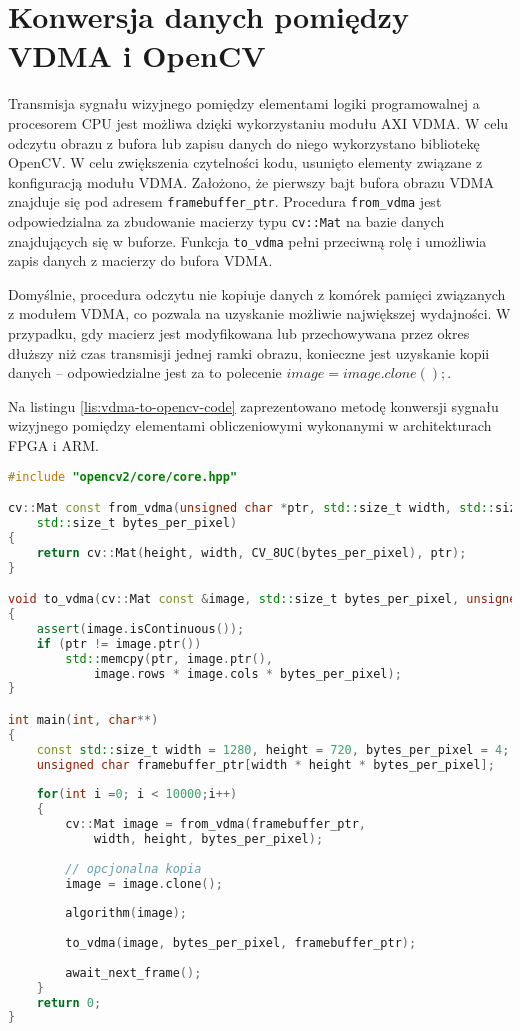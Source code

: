 \section{Konwersja danych pomiędzy VDMA i OpenCV}
\label{sec:vdma-to-opencv}

Transmisja sygnału wizyjnego pomiędzy elementami logiki programowalnej a procesorem CPU jest możliwa dzięki wykorzystaniu modułu AXI VDMA. W celu odczytu obrazu z bufora lub zapisu danych do niego wykorzystano bibliotekę OpenCV. W celu zwiększenia czytelności kodu, usunięto elementy związane z konfiguracją modułu VDMA. Założono, że pierwszy bajt bufora obrazu VDMA znajduje się pod adresem \texttt{framebuffer\_ptr}. Procedura \texttt{from\_vdma} jest odpowiedzialna za zbudowanie macierzy typu \texttt{cv::Mat} na bazie danych znajdujących się w buforze. Funkcja \texttt{to\_vdma} pełni przeciwną rolę i umożliwia zapis danych z macierzy do bufora VDMA.

Domyślnie, procedura odczytu nie kopiuje danych z komórek pamięci związanych z modułem VDMA, co pozwala na uzyskanie możliwie największej wydajności. W przypadku, gdy macierz jest modyfikowana lub przechowywana przez okres dłuższy niż czas transmisji jednej ramki obrazu, konieczne jest uzyskanie kopii danych -- odpowiedzialne jest za to polecenie $image = image.clone();$.

Na listingu \ref{lis:vdma-to-opencv-code} zaprezentowano metodę konwersji sygnału wizyjnego pomiędzy elementami obliczeniowymi wykonanymi w architekturach FPGA i ARM.


\begin{lstlisting}[language=C++, label=lis:vdma-to-opencv-code, caption=Konwersja sygnału wizyjnego pomiędzy AXI VDMA i \texttt{cv::Mat}.]
#include "opencv2/core/core.hpp"

cv::Mat const from_vdma(unsigned char *ptr, std::size_t width, std::size_t height,
	std::size_t bytes_per_pixel)
{
	return cv::Mat(height, width, CV_8UC(bytes_per_pixel), ptr);
}

void to_vdma(cv::Mat const &image, std::size_t bytes_per_pixel, unsigned char *ptr)
{
	assert(image.isContinuous());
	if (ptr != image.ptr())
		std::memcpy(ptr, image.ptr(),
			image.rows * image.cols * bytes_per_pixel);
}

int main(int, char**)
{
	const std::size_t width = 1280, height = 720, bytes_per_pixel = 4;
	unsigned char framebuffer_ptr[width * height * bytes_per_pixel];
	
	for(int i =0; i < 10000;i++)
	{
		cv::Mat image = from_vdma(framebuffer_ptr,
			width, height, bytes_per_pixel);
		
		// opcjonalna kopia
		image = image.clone();
		
		algorithm(image);
		
		to_vdma(image, bytes_per_pixel, framebuffer_ptr);
		
		await_next_frame();
	}
	return 0;
}

\end{lstlisting}